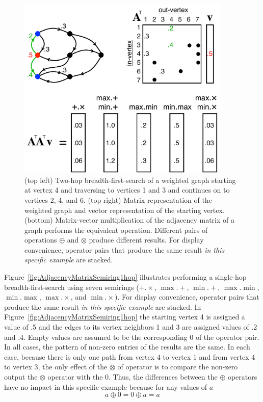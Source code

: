 \begin{figure}[!htb]
  \centering
    \includegraphics[width=4in]{figures/AdjacencyMatrixSemiring2hop.pdf}
      \caption{(top left) Two-hop breadth-first-search of a weighted graph starting at vertex 4 and traversing to vertices 1 and 3 and continues on to vertices 2, 4, and 6. (top right) Matrix representation of the weighted graph and vector representation of the starting vertex. (bottom) Matrix-vector multiplication of the adjacency matrix of a graph performs the equivalent operation.  Different pairs of operations $\oplus$ and $\otimes$ produce different results. For display convenience, operator pairs that produce the same result \emph{in this specific example} are stacked.
}
      \label{fig:AdjacencyMatrixSemiring2hop}
\end{figure}

  Figure~\ref{fig:AdjacencyMatrixSemiring1hop} illustrates performing a single-hop breadth-first-search using seven semirings (${+}.{\times}$, ${\max}.{+}$, ${\min}.{+}$, ${\max}.{\min}$, ${\min}.{\max}$, ${\max}.{\times}$, and ${\min}.{\times}$).
For display convenience, operator pairs that produce the same result \emph{in this specific example} are stacked.  In Figure~\ref{fig:AdjacencyMatrixSemiring1hop} the starting vertex 4 is assigned a value of .5 and the edges to its vertex neighbors 1 and 3 are assigned values of .2 and .4.  Empty values are assumed to be the corresponding 0 of the operator pair. In all cases, the pattern of non-zero entries of the results are the same.  In each case, because there is only one path from vertex 4 to vertex 1 and from vertex 4 to vertex 3, the only effect of the $\otimes$ of operator is to compare the non-zero output the $\otimes$ operator with the 0.  Thus, the differences between the $\oplus$ operators have no impact in this specific example because for any values of $a$
$$
  a \oplus 0 = 0 \oplus a = a
$$

